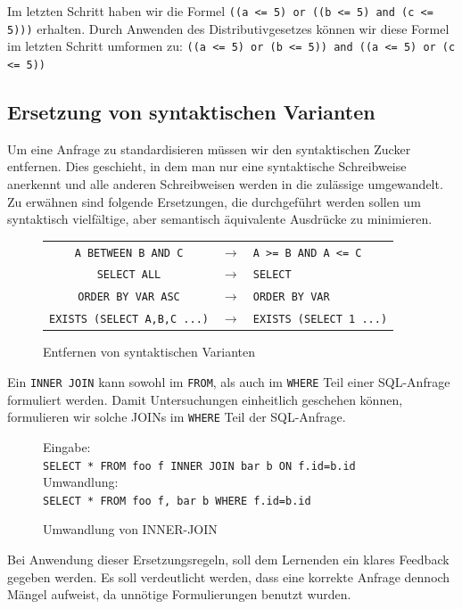 Im letzten Schritt haben wir die Formel \verb|((a <= 5) or ((b <= 5) and (c <= 5)))| erhalten. Durch Anwenden des Distributivgesetzes können wir diese Formel im letzten Schritt umformen zu: \verb|((a <= 5) or (b <= 5)) and ((a <= 5) or (c <= 5))|

\subsection{Ersetzung von syntaktischen Varianten}

Um eine Anfrage zu standardisieren müssen wir den syntaktischen Zucker entfernen. Dies geschieht, in dem man nur eine syntaktische Schreibweise anerkennt und alle anderen Schreibweisen werden in die zulässige umgewandelt. Zu erwähnen sind folgende Ersetzungen, die durchgeführt werden sollen um syntaktisch vielfältige, aber semantisch äquivalente Ausdrücke zu minimieren.

\begin{figure}
\begin{tabular}{ccl}
\verb|A BETWEEN B AND C| & $\to$  & \verb|A >= B AND A <= C|\\
\verb|SELECT ALL| & $\to$ & \verb|SELECT|\\
\verb|ORDER BY VAR ASC| &  $\to$ & \verb|ORDER BY VAR|\\
\verb|EXISTS (SELECT A,B,C ...)| & $\to$ & \verb|EXISTS (SELECT 1 ...)|\\
\end{tabular}
\caption{Entfernen von syntaktischen Varianten}
\end{figure}

Ein \verb|INNER JOIN| kann sowohl im \verb|FROM|, als auch im \verb|WHERE| Teil einer SQL-Anfrage formuliert werden. Damit Untersuchungen einheitlich geschehen können, formulieren wir solche JOINs im \verb|WHERE| Teil der SQL-Anfrage.

\begin{figure}
Eingabe:\\
\verb|SELECT * FROM foo f INNER JOIN bar b ON f.id=b.id|\\

Umwandlung:\\
\verb|SELECT * FROM foo f, bar b WHERE f.id=b.id|\\
\caption{Umwandlung von INNER-JOIN}
\end{figure}

Bei Anwendung dieser Ersetzungsregeln, soll dem Lernenden ein klares Feedback gegeben werden. Es soll verdeutlicht werden, dass eine korrekte Anfrage dennoch Mängel aufweist, da unnötige Formulierungen benutzt wurden.

